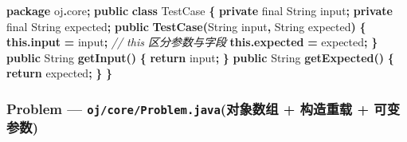 \documentclass[
  11pt,
]{ctexart}
\newenvironment{Shaded}{\begin{snugshade}}{\end{snugshade}}
\newcommand{\BuiltInTok}[1]{#1}
\newcommand{\CommentTok}[1]{\textcolor[rgb]{0.56,0.35,0.01}{\textit{#1}}}
\newcommand{\ControlFlowTok}[1]{\textcolor[rgb]{0.13,0.29,0.53}{\textbf{#1}}}
\newcommand{\DataTypeTok}[1]{\textcolor[rgb]{0.13,0.29,0.53}{#1}}
\newcommand{\FunctionTok}[1]{\textcolor[rgb]{0.13,0.29,0.53}{\textbf{#1}}}
\newcommand{\ImportTok}[1]{#1}
\newcommand{\KeywordTok}[1]{\textcolor[rgb]{0.13,0.29,0.53}{\textbf{#1}}}
\newcommand{\NormalTok}[1]{#1}
\newcommand{\OperatorTok}[1]{\textcolor[rgb]{0.81,0.36,0.00}{\textbf{#1}}}
\begin{document}
\begin{Shaded}
\begin{Highlighting}[]
\KeywordTok{package}\ImportTok{ oj}\OperatorTok{.}\ImportTok{core}\OperatorTok{;}
\KeywordTok{public} \KeywordTok{class}\NormalTok{ TestCase }\OperatorTok{\{}
    \KeywordTok{private} \DataTypeTok{final} \BuiltInTok{String}\NormalTok{ input}\OperatorTok{;}
    \KeywordTok{private} \DataTypeTok{final} \BuiltInTok{String}\NormalTok{ expected}\OperatorTok{;}
    \KeywordTok{public} \FunctionTok{TestCase}\OperatorTok{(}\BuiltInTok{String}\NormalTok{ input}\OperatorTok{,} \BuiltInTok{String}\NormalTok{ expected}\OperatorTok{)} \OperatorTok{\{}
        \KeywordTok{this}\OperatorTok{.}\FunctionTok{input} \OperatorTok{=}\NormalTok{ input}\OperatorTok{;}            \CommentTok{// this 区分参数与字段}
        \KeywordTok{this}\OperatorTok{.}\FunctionTok{expected} \OperatorTok{=}\NormalTok{ expected}\OperatorTok{;}
    \OperatorTok{\}}
    \KeywordTok{public} \BuiltInTok{String} \FunctionTok{getInput}\OperatorTok{()}    \OperatorTok{\{} \ControlFlowTok{return}\NormalTok{ input}\OperatorTok{;} \OperatorTok{\}}
    \KeywordTok{public} \BuiltInTok{String} \FunctionTok{getExpected}\OperatorTok{()} \OperatorTok{\{} \ControlFlowTok{return}\NormalTok{ expected}\OperatorTok{;} \OperatorTok{\}}
\OperatorTok{\}}
\end{Highlighting}
\end{Shaded}

\hypertarget{problem-ojcoreproblem.javaux5bf9ux8c61ux6570ux7ec4-ux6784ux9020ux91cdux8f7d-ux53efux53d8ux53c2ux6570}{%
\subsubsection{\texorpdfstring{Problem ---
\texttt{oj/core/Problem.java}(对象数组 + 构造重载 +
可变参数)}{Problem --- oj/core/Problem.java(对象数组 + 构造重载 + 可变参数)}}\label{problem-ojcoreproblem.javaux5bf9ux8c61ux6570ux7ec4-ux6784ux9020ux91cdux8f7d-ux53efux53d8ux53c2ux6570}}
\end{document}
